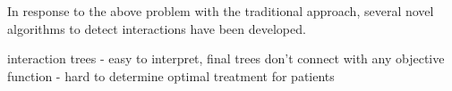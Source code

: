 \documentclass[12pt]{article}
\begin{document}
In response to the above problem with the traditional approach, several novel algorithms to detect interactions have been developed.

interaction trees - easy to interpret, final trees don't connect with any objective function - hard to determine optimal treatment for patients

%




%
%
%
%
\end{document}
